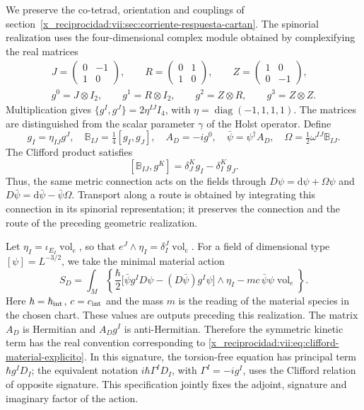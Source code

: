 We preserve the co-tetrad, orientation and couplings of
section~\ref{x_reciprocidad:vii:sec:corriente-respuesta-cartan}. The spinorial
realization uses the four-dimensional complex module obtained by
complexifying the real matrices
\begin{equation}
 \begin{gathered}
 J=\begin{pmatrix}0&-1\\1&0\end{pmatrix},\qquad
 R=\begin{pmatrix}0&1\\1&0\end{pmatrix},\qquad
 Z=\begin{pmatrix}1&0\\0&-1\end{pmatrix},\\
 g^0=J\otimes I_2,\qquad g^1=R\otimes I_2,\qquad
 g^2=Z\otimes R,\qquad g^3=Z\otimes Z.
 \end{gathered}
 \label{x_reciprocidad:vii:eq:clifford-material-explicito}
\end{equation}
Multiplication gives
\(\{g^I,g^J\}=2\eta^{IJ}I_4\), with
\(\eta=\operatorname{diag}(-1,1,1,1)\). The matrices are
distinguished from the scalar parameter \(\gamma\) of the Holst
operator. Define
\begin{equation}
 g_I=\eta_{IJ}g^J,\quad
 \mathbb B_{IJ}=\tfrac14[g_I,g_J],\quad
 A_D=-i g^0,\quad \bar\psi=\psi^\dagger A_D,\quad
 \Omega=\tfrac12\omega^{IJ}\mathbb B_{IJ}.
 \label{x_reciprocidad:vii:eq:adjunto-conexion-espinorial}
\end{equation}
The Clifford product satisfies
\[
 [\mathbb B_{IJ},g^K]=\delta_J^K g_I-\delta_I^K g_J.
\]
Thus, the same metric connection acts on the fields through
\(D\psi=\mathrm d\psi+\Omega\psi\) and
\(D\bar\psi=\mathrm d\bar\psi-\bar\psi\Omega\).
Transport along a route is obtained by integrating this connection in
its spinorial representation; it preserves the connection and the route of the
preceding geometric realization.

Let \(\eta_I=\iota_{E_I}\operatorname{vol}_e\), so that
\(e^J\wedge\eta_I=\delta_I^J\operatorname{vol}_e\). For a
field of dimensional type \([\psi]=L^{-3/2}\), we take the minimal
material action
\begin{equation}
 S_D=\int_M\left\{
 \frac{\hbar}{2}
 \bigl[\bar\psi g^I D\psi-(D\bar\psi)g^I\psi\bigr]\wedge\eta_I
 -mc\,\bar\psi\psi\operatorname{vol}_e\right\}.
 \label{x_reciprocidad:vii:eq:accion-dirac-material}
\end{equation}
Here \(\hbar=\hbar_{\rm int}\), \(c=c_{\rm int}\) and the mass
\(m\) is the reading of the material species in the chosen chart.
These values are outputs preceding this realization. The matrix
\(A_D\) is Hermitian and \(A_Dg^I\) is anti-Hermitian. Therefore the
symmetric kinetic term has the real convention corresponding to
\eqref{x_reciprocidad:vii:eq:clifford-material-explicito}. In this signature, the torsion-free
equation has principal term \(\hbar g^I D_I\); the equivalent
notation \(i\hbar\Gamma^I D_I\), with \(\Gamma^I=-i g^I\),
uses the Clifford relation of opposite signature. This specification jointly
fixes the adjoint, signature and imaginary factor of the action.

